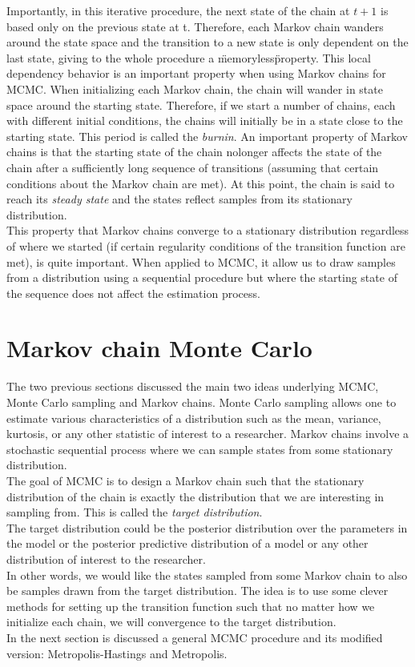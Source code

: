 Importantly, in this iterative procedure, the next state of the chain at $t+1$ is based only on the previous state at t. Therefore, each Markov chain wanders around the state space and the transition to a new state is only dependent on the last state, giving to the whole procedure a \"memoryless\" property.
This local dependency behavior is an important property when using Markov chains for MCMC.
When initializing each Markov chain, the chain will wander in state space around the
starting state. Therefore, if we start a number of chains, each with different initial conditions, the chains will initially be in a state close to the starting state. This period is called the \textit{burnin}. An important property of Markov chains is that the starting state of the chain nolonger affects the state of the chain after a sufficiently long sequence of transitions (assuming that certain conditions about the Markov chain are met). At this point, the chain is said to reach its \textit{steady state} and the states reflect samples from its stationary distribution.
\\ This property that Markov chains converge to a stationary distribution regardless of where we started (if certain regularity conditions of the transition function are met), is quite important.
When applied to MCMC, it allow us to draw samples from a distribution using a sequential
procedure but where the starting state of the sequence does not affect the estimation process.
\newpage
\section{Markov chain Monte Carlo}
The two previous sections discussed the main two ideas underlying MCMC, Monte Carlo
sampling and Markov chains. Monte Carlo sampling allows one to estimate various characteristics of a distribution such as the mean, variance, kurtosis, or any other statistic of interest to a researcher. Markov chains involve a stochastic sequential process where we can sample states from some stationary distribution.\\
The goal of MCMC is to design a Markov chain such that the stationary distribution of
the chain is exactly the distribution that we are interesting in sampling from. This is called the \textit{target distribution}.\\
The target distribution could be the posterior distribution over the parameters in the model or the posterior predictive distribution of a model or any other distribution of interest to the researcher.\\
In other words, we would like the states sampled from some Markov chain to also be samples drawn from the target distribution. The idea is to use some clever methods for setting up the transition function such that no matter how we initialize each chain, we will convergence to the target distribution.\\
In the next section is discussed a general MCMC procedure and its modified version: Metropolis-Hastings and Metropolis.
